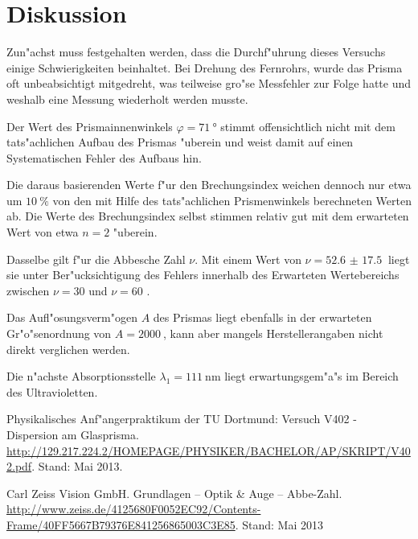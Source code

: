 \clearpage

\section{Diskussion}
\label{sec:diskussion}
	Zun"achst muss festgehalten werden, dass die Durchf"uhrung dieses Versuchs einige Schwierigkeiten beinhaltet.
	Bei Drehung des Fernrohrs, wurde das Prisma oft unbeabsichtigt mitgedreht, was teilweise gro"se Messfehler zur Folge hatte und weshalb eine Messung wiederholt werden musste.
	
	Der Wert des Prismainnenwinkels $\varphi = \SI{71}{\degree}$ stimmt offensichtlich nicht mit dem tats"achlichen Aufbau des Prismas "uberein und weist damit auf einen Systematischen Fehler des Aufbaus hin.

	Die daraus basierenden Werte f"ur den Brechungsindex weichen dennoch nur etwa um $\SI{10}{\percent}$ von den mit Hilfe des tats"achlichen Prismenwinkels berechneten Werten ab.
	Die Werte des Brechungsindex selbst stimmen relativ gut mit dem erwarteten Wert von etwa $n = 2$ "uberein.

	Dasselbe gilt f"ur die Abbesche Zahl $\nu$.
	Mit einem Wert von $\nu = \SI{52.6(175)}{}$ liegt sie unter Ber"ucksichtigung des Fehlers innerhalb des Erwarteten Wertebereichs zwischen $\nu = 30$ und $\nu = 60$ \cite{abbe}.

	Das Aufl"osungsverm"ogen $A$ des Prismas liegt ebenfalls in der erwarteten Gr"o"senordnung von $A = \SI{2000}{}$, kann aber mangels Herstellerangaben nicht direkt verglichen werden.

	Die n"achste Absorptionsstelle $\lambda_1 = \SI{111}{\nano \meter}$ liegt erwartungsgem"a"s im Bereich des Ultravioletten.


\begin{thebibliography}{9}
	 Physikalisches Anf"angerpraktikum der TU Dortmund: Versuch V402 - Dispersion am Glasprisma. \url{http://129.217.224.2/HOMEPAGE/PHYSIKER/BACHELOR/AP/SKRIPT/V402.pdf}. Stand: Mai 2013.

	 Carl Zeiss Vision GmbH. Grundlagen -- Optik \& Auge -- Abbe-Zahl. \url{http://www.zeiss.de/4125680F0052EC92/Contents-Frame/40FF5667B79376E841256865003C3E85}. Stand: Mai 2013
\end{thebibliography}
